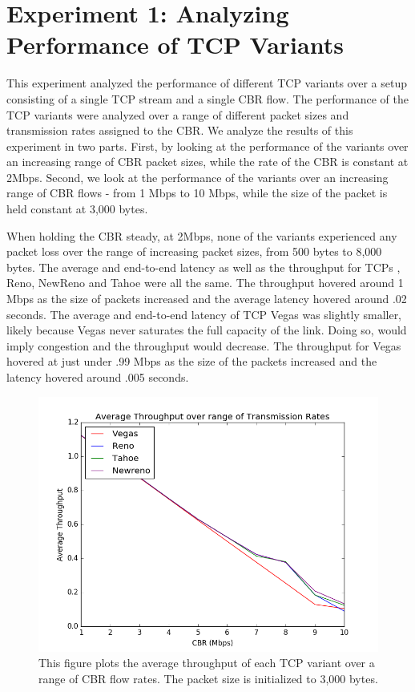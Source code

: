 \section{Experiment 1: Analyzing Performance of TCP Variants}

This experiment analyzed the performance of different TCP variants over a setup consisting of a single TCP stream and a single CBR flow. The performance of the TCP variants were analyzed over a range of different packet sizes and transmission rates assigned to the CBR. We analyze the results of this experiment in two parts. First, by looking at the performance of the variants over an increasing range of CBR packet sizes, while the rate of the CBR is constant at 2Mbps. Second, we look at the performance of the variants over an increasing range of CBR flows - from 1 Mbps to 10 Mbps, while the size of the packet is held constant at 3,000 bytes.

When holding the CBR steady, at 2Mbps, none of the variants experienced any packet loss over the range of increasing packet sizes, from 500 bytes to 8,000 bytes. The average and end-to-end latency as well as the throughput for TCPs , Reno, NewReno and Tahoe were all the same. The throughput hovered around 1 Mbps as the size of packets increased and the average latency hovered around .02 seconds. The average and end-to-end latency of TCP Vegas was slightly smaller, likely because Vegas never saturates the full capacity of the link. Doing so, would imply congestion and the throughput would decrease. The throughput for Vegas hovered at just under .99 Mbps as the size of the packets increased and the latency hovered around .005 seconds.

\begin{figure}[!htbp]
	\includegraphics[scale=0.4]{P1.png}
	\caption{This figure plots the average throughput of each TCP variant over a range of CBR flow rates. The packet size is initialized to 3,000 bytes.}
	\label{a:label}
\end{figure}

